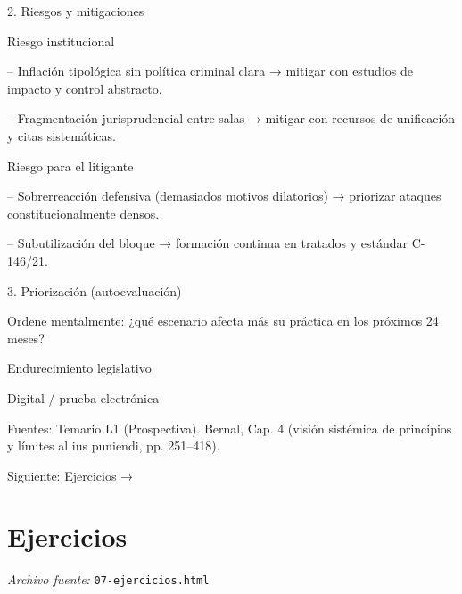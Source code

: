\documentclass[11pt,a4paper]{article}
\begin{document}
      2. Riesgos y mitigaciones\par



          Riesgo institucional\par



-- Inflación tipológica sin política criminal clara → mitigar con estudios de impacto y control abstracto.\par


-- Fragmentación jurisprudencial entre salas → mitigar con recursos de unificación y citas sistemáticas.\par





          Riesgo para el litigante\par



-- Sobrerreacción defensiva (demasiados motivos dilatorios) → priorizar ataques constitucionalmente densos.\par


-- Subutilización del bloque → formación continua en tratados y estándar C-146/21.\par









      3. Priorización (autoevaluación)\par

      Ordene mentalmente: ¿qué escenario afecta más su práctica en los próximos 24 meses?\par

      Endurecimiento legislativo\par
      Digital / prueba electrónica\par





      Fuentes: Temario L1 (Prospectiva). Bernal, Cap. 4 (visión sistémica de principios y límites al ius puniendi, pp. 251–418).\par


    Siguiente: Ejercicios →\par

\section{Ejercicios}
\noindent\textit{Archivo fuente:} \texttt{07-ejercicios.html}
\end{document}

